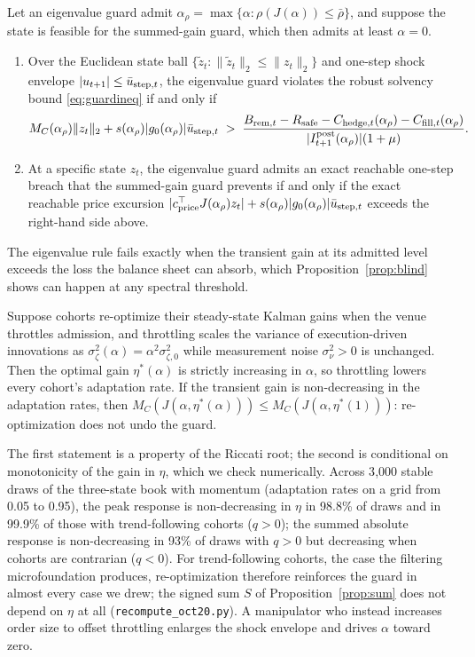 \begin{proposition}\label{prop:dominance}
Let an eigenvalue guard admit $\alpha_\rho=\max\{\alpha:\rho(J(\alpha))\le\bar\rho\}$, and suppose the state is feasible for the summed-gain guard, which then admits at least $\alpha=0$.
\begin{enumerate}[label=(\roman*)]
\item Over the Euclidean state ball $\{\tilde z_t:\|\tilde z_t\|_2\le\|z_t\|_2\}$ and one-step shock envelope $|u_{t+1}|\le\bar u_{{\rm step},t}$, the eigenvalue guard violates the robust solvency bound \eqref{eq:guardineq} if and only if
\[
M_C(\alpha_\rho)\|z_t\|_2+s(\alpha_\rho)|g_0(\alpha_\rho)|\bar u_{{\rm step},t}\;>\;\frac{B_{{\rm rem},t}-R_{\rm safe}-C_{{\rm hedge},t}(\alpha_\rho)-C_{{\rm fill},t}(\alpha_\rho)}{|I^{\rm post}_{t+1}(\alpha_\rho)|(1+\mu)} .
\]
\item At a specific state $z_t$, the eigenvalue guard admits an exact reachable one-step breach that the summed-gain guard prevents if and only if the exact reachable price excursion $|c^\top_{\rm price}J(\alpha_\rho)z_t|+s(\alpha_\rho)|g_0(\alpha_\rho)|\bar u_{{\rm step},t}$ exceeds the right-hand side above.
\end{enumerate}
\end{proposition}

The eigenvalue rule fails exactly when the transient gain at its admitted level exceeds the loss the balance sheet can absorb, which Proposition~\ref{prop:blind} shows can happen at any spectral threshold.

\begin{proposition}\label{prop:lucas}
Suppose cohorts re-optimize their steady-state Kalman gains when the venue throttles admission, and throttling scales the variance of execution-driven innovations as $\sigma_\zeta^2(\alpha)=\alpha^2\sigma_{\zeta,0}^2$ while measurement noise $\sigma_\nu^2>0$ is unchanged. Then the optimal gain $\eta^*(\alpha)$ is strictly increasing in $\alpha$, so throttling lowers every cohort's adaptation rate. If the transient gain is non-decreasing in the adaptation rates, then $M_C(J(\alpha,\eta^*(\alpha)))\le M_C(J(\alpha,\eta^*(1)))$: re-optimization does not undo the guard.
\end{proposition}

The first statement is a property of the Riccati root; the second is conditional on monotonicity of the gain in $\eta$, which we check numerically. Across 3{,}000 stable draws of the three-state book with momentum (adaptation rates on a grid from 0.05 to 0.95), the peak response is non-decreasing in $\eta$ in 98.8\% of draws and in 99.9\% of those with trend-following cohorts ($q>0$); the summed absolute response is non-decreasing in 93\% of draws with $q>0$ but decreasing when cohorts are contrarian ($q<0$). For trend-following cohorts, the case the filtering microfoundation produces, re-optimization therefore reinforces the guard in almost every case we drew; the signed sum $S$ of Proposition~\ref{prop:sum} does not depend on $\eta$ at all (\texttt{recompute\_oct20.py}). A manipulator who instead increases order size to offset throttling enlarges the shock envelope and drives $\alpha$ toward zero.
